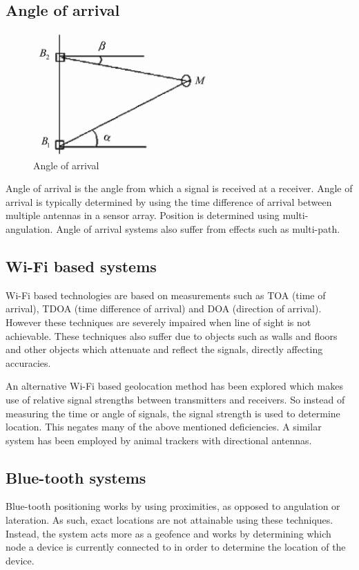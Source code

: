 \documentclass[11pt,a4paper]{report}
\begin{document}
	\subsection{Angle of arrival}
		\begin{figure}[h!]
			\centering
			\includegraphics[width=0.6\textwidth]{angle_of_arrival}
			\caption{Angle of arrival}
		\end{figure}
		Angle of arrival is the angle from which a signal is received at a receiver. Angle of arrival is typically determined by using the time difference of arrival between multiple antennas in a sensor array. Position is determined using multi-angulation.
		Angle of arrival systems also suffer from effects such as multi-path.
	
	\subsection{Wi-Fi based systems}
		Wi-Fi based technologies are based on measurements such as TOA (time of arrival), TDOA (time difference of arrival) and DOA (direction of arrival). However these techniques are severely impaired when line of sight is not achievable. These techniques also suffer due to objects such as walls and floors and other objects which attenuate and reflect the signals, directly affecting accuracies.
	
		An alternative Wi-Fi based geolocation method has been explored which makes use of relative signal strengths between transmitters and receivers. So instead of measuring the time or angle of signals, the signal strength is used to determine location. This negates many of the above mentioned deficiencies. A similar system has been employed by animal trackers with directional antennas.
		\cite{yongguang_chen_signal_2002}
	
	\subsection{Blue-tooth systems}
		Blue-tooth positioning works by using proximities, as opposed to angulation or lateration. As such, exact locations are not attainable using these techniques. Instead, the system acts more as a geofence and works by determining which node a device is currently connected to in order to determine the location of the device.
	
\end{document}
